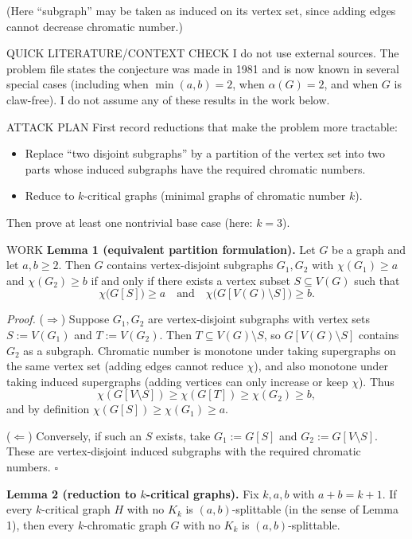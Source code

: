 (Here ``subgraph'' may be taken as induced on its vertex set, since adding edges
cannot decrease chromatic number.)

QUICK LITERATURE/CONTEXT CHECK
I do not use external sources.
The problem file states the conjecture was made in 1981 and is now known in
several special cases (including when $\min(a,b)=2$, when $\alpha(G)=2$, and when
$G$ is claw-free).
I do not assume any of these results in the work below.

ATTACK PLAN
First record reductions that make the problem more tractable:
\begin{itemize}
\item Replace ``two disjoint subgraphs'' by a partition of the vertex set into two
parts whose induced subgraphs have the required chromatic numbers.
\item Reduce to $k$-critical graphs (minimal graphs of chromatic number $k$).
\end{itemize}
Then prove at least one nontrivial base case (here: $k=3$).

WORK
\textbf{Lemma 1 (equivalent partition formulation).}
Let $G$ be a graph and let $a,b\ge2$.
Then $G$ contains vertex-disjoint subgraphs $G_1,G_2$ with
$\chi(G_1)\ge a$ and $\chi(G_2)\ge b$
if and only if there exists a vertex subset $S\subseteq V(G)$ such that
\[
\chi\bigl(G[S]\bigr)\ge a\quad\text{and}\quad \chi\bigl(G[V(G)\setminus S]\bigr)\ge b.
\]

\emph{Proof.}
($\Rightarrow$) Suppose $G_1,G_2$ are vertex-disjoint subgraphs with vertex sets
$S:=V(G_1)$ and $T:=V(G_2)$.
Then $T\subseteq V(G)\setminus S$, so
$G[V(G)\setminus S]$ contains $G_2$ as a subgraph.
Chromatic number is monotone under taking supergraphs on the same vertex set
(adding edges cannot reduce $\chi$), and also monotone under taking induced
supergraphs (adding vertices can only increase or keep $\chi$).
Thus
\[
\chi(G[V\setminus S]) \ge \chi(G[T]) \ge \chi(G_2) \ge b,
\]
and by definition $\chi(G[S])\ge \chi(G_1)\ge a$.

($\Leftarrow$) Conversely, if such an $S$ exists, take $G_1:=G[S]$ and
$G_2:=G[V\setminus S]$. These are vertex-disjoint induced subgraphs with the
required chromatic numbers.
\hfill $\square$

\medskip
\textbf{Lemma 2 (reduction to $k$-critical graphs).}
Fix $k,a,b$ with $a+b=k+1$.
If every $k$-critical graph $H$ with no $K_k$ is $(a,b)$-splittable (in the sense
of Lemma 1), then every $k$-chromatic graph $G$ with no $K_k$ is
$(a,b)$-splittable.

